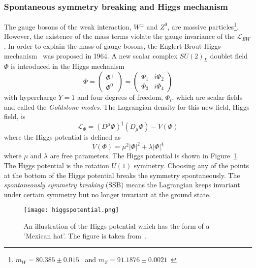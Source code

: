 \subsubsection{Spontaneous symmetry breaking and Higgs mechanism}
\label{subsubsec:sm_Higgs_mechanism}
The gauge bosons of the weak interaction, $W^{\pm}$ and $Z^{0}$, are massive particles\footnote{$m_{W}=80.385 \pm 0.015$~{\GeV} and $m_{Z}=91.1876 \pm 0.0021$~{\GeV}}.
However, the existence of the mass terms violate the gauge invariance of the $\mathcal{L}_{EW}$.
In order to explain the mass of gauge bosons, the Englert-Brout-Higgs mechanism~\cite{Higgs:1966ev, Higgs:1964pj, Higgs:1964ia, Englert:1964et, Guralnik:1964eu} was proposed in 1964.
A new scalar complex $SU(2)_{L}$ doublet field $\Phi$ is introduced in the Higgs mechanism
%
\begin{equation}
    \Phi = \left(\begin{matrix}\Phi^{+}\\\Phi^{0}\end{matrix}\right) = \left(\begin{matrix}\Phi_{1} & i\Phi_{2}\\\Phi_{3} & i\Phi_{4}\end{matrix}\right)
    \label{eq:sm_higgs_doublet}
\end{equation}
%
with hypercharge $Y = 1$ and four degrees of freedom, $\Phi_{i}$, which are scalar fields and called the \textit{Goldstone modes}.
The Lagrangian density for this new field, Higgs field, is
%
\begin{equation}
    \mathcal{L}_{\Phi} = (D^{\mu}\Phi)^{\dagger}(D_{\mu}\Phi) - V(\Phi)
    \label{eq:sm_higgs_lagrangian}
\end{equation}
%
where the Higgs potential is defined as
%
\begin{equation}
    V(\Phi) = \mu^{2}|\Phi|^{2} + \lambda|\Phi|^{4}
    \label{eq:sm_higgs_potential}
\end{equation}
%
where $\mu$ and $\lambda$ are free parameters.
The Higgs potential is shown in Figure~\ref{fig:sm_higgs_potential}.
The Higgs potential is the rotation $U(1)$ symmetry.
Choosing any of the points at the bottom of the Higgs potential breaks the symmetry spontaneously.
The \textit{spontaneously symmetry breaking} (SSB) means the Lagrangian keeps invariant under certain symmetry but no longer invariant at the ground state.

\begin{figure}[htbp]
    \begin{center}
        \texttt{[image: higgspotential.png]}
        \caption{An illustration of the Higgs potential which has the form of a ’Mexican hat’.
        The figure is taken from~\cite{Ellis:2013jnq}.}
        \label{fig:sm_higgs_potential}
    \end{center}
\end{figure}

